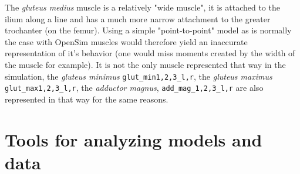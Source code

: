 \documentclass[11pt]{article}
\begin{document}
\begin{enumerate}
    \begin{adjustwidth}{0.5cm}{}
        The \textit{gluteus medius} muscle is a relatively "wide muscle", it is attached to the ilium along a line and has a much more narrow attachment to the greater trochanter (on the femur). Using a simple "point-to-point" model as is normally the case with OpenSim muscles would therefore yield an inaccurate representation of it's behavior (one would miss moments created by the width of the muscle for example). 
        \BlankLine
        It is not the only muscle represented that way in the simulation, the \textit{gluteus minimus} \texttt{glut\_min1,2,3\_l,r}, the \textit{gluteus maximus} \texttt{glut\_max1,2,3\_l,r}, the \textit{adductor magnus}, \texttt{add\_mag\_1,2,3\_l,r} are also represented in that way for the same reasons.
    \end{adjustwidth}
\end{enumerate}

\section{Tools for analyzing models and data}
\end{document}
